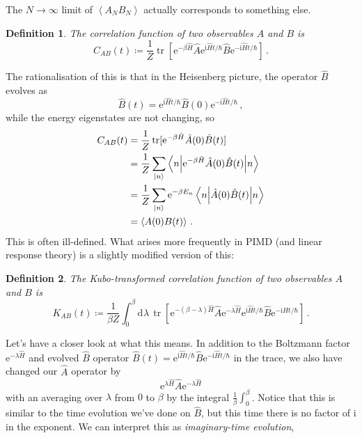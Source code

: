 \documentclass{article}
\theoremstyle{plain}\theoremheaderfont{\normalfont\itshape}\theorembodyfont{\rmfamily}\theoremseparator{.}\newtheorem*{rem}{Remark}\newtheorem*{ex}{Example}\newtheorem*{proof}{Proof}\newtheorem*{altp}{Alternative proof}
\theoremstyle{plain}\theoremheaderfont{\normalfont\bfseries}\theorembodyfont{\rmfamily}\theoremseparator{.}\newtheorem{thm}{Theorem}[section]\newtheorem{lem}[thm]{Lemma}\newtheorem{prop}[thm]{Proposition}\newtheorem*{cor}{Corollary}\newtheorem{defn}[thm]{Definition}\newtheorem{clm}[thm]{Claim}\newtheorem{clminproof}{Claim}
\theoremstyle{break}\theoremheaderfont{\normalfont\itshape}\theorembodyfont{\rmfamily}\theoremseparator{.\medskip}\newtheorem*{proofskip}{Proof}\newtheorem*{exs}{Examples}\newtheorem*{rems}{Remarks}
\theoremstyle{break}\theoremheaderfont{\normalfont\bfseries}\theorembodyfont{\rmfamily}\theoremseparator{.\medskip}\newtheorem{lemskip}[thm]{Lemma}\newtheorem{defnskip}[thm]{Definition}\newtheorem{propskip}[thm]{Proposition}\newtheorem{thmskip}[thm]{Theorem}
\numberwithin{equation}{section}
\newcommand{\ii}{\mathrm{i}}
\newcommand{\ee}{\mathrm{e}}
\newcommand{\dd}[2][]{\mathrm{d}^{#1} #2\,}
\newcommand{\ket}[1]{\left| #1 \right\rangle}
\newcommand{\eval}[1]{\left\langle #1 \right\rangle}
\newcommand{\expval}[2]{\left\langle #2 \middle| #1 \middle| #2 \right\rangle}
\DeclareMathOperator{\tr}{tr}
\begin{document}
    The \(N\to \infty\) limit of \(\eval{A_N B_N}\) actually corresponds to something else.
    \begin{defn}
        The \textit{correlation function} of two observables \(A\) and \(B\) is
        \begin{equation}
            C_{AB}(t)\coloneqq\frac{1}{Z}\tr[\ee^{-\beta\hat{H}}\hat{A}\ee^{\ii\hat{H}t/\hbar}\hat{B}\ee^{-\ii\hat{H}t/\hbar}]\,.
        \end{equation}
    \end{defn}
    The rationalisation of this is that in the Heisenberg picture, the operator \(\hat{B}\) evolves as
    \begin{equation}
        \hat{B}(t)=\ee^{\ii\hat{H}t/\hbar}\hat{B}(0)\ee^{-\ii\hat{H}t/\hbar}\,,
    \end{equation}
    while the energy eigenstates are not changing, so
    \begin{align}
            C_{AB}(t)&=\frac{1}{Z}\tr[\ee^{-\beta\hat{H}}\hat{A}(0)\hat{B}(t)]\notag\\
            &=\frac{1}{Z}\sum_{\ket{n}}\expval{\ee^{-\beta \hat{H}}\hat{A}(0)\hat{B}(t)}{n}\notag \\
            &=\frac{1}{Z}\sum_{\ket{n}}\ee^{-\beta E_n}\expval{\hat{A}(0)\hat{B}(t)}{n}\notag \\
            &=\eval{A(0)B(t)}\,.
    \end{align}
    This is often ill-defined. What arises more frequently in PIMD (and linear response theory) is a slightly modified version of this:
    \begin{defn}
        The \textit{Kubo-transformed correlation function} of two observables \(A\) and \(B\) is
        \begin{equation}
            K_{AB}(t)\coloneqq\frac{1}{\beta Z}\int_{0}^{\beta}\dd{\lambda}\tr[\ee^{-(\beta-\lambda)\hat{H}}\hat{A}\ee^{-\lambda\hat{H}}\ee^{\ii\hat{H}t/\hbar}\hat{B}\ee^{-\ii\hat{H}t/\hbar}]\,.
        \end{equation}
    \end{defn}
    Let's have a closer look at what this means. In addition to the Boltzmann factor \(\ee^{-\lambda\hat{H}}\) and evolved \(\hat{B}\) operator \(\hat{B}(t)=\ee^{\ii\hat{H}t/\hbar}\hat{B}\ee^{-\ii\hat{H}t/\hbar}\) in the trace, we also have changed our \(\hat{A}\) operator by
    \begin{equation}
        \ee^{\lambda\hat{H}}\hat{A}\ee^{-\lambda\hat{H}}
    \end{equation}
    with an averaging over \(\lambda\) from \(0\) to \(\beta\) by the integral \(\frac{1}{\beta}\int_{0}^{\beta}\). Notice that this is similar to the time evolution we've done on \(\hat{B}\), but this time there is no factor of \(\ii\) in the exponent. We can interpret this as \textit{imaginary-time evolution},
\end{document}
